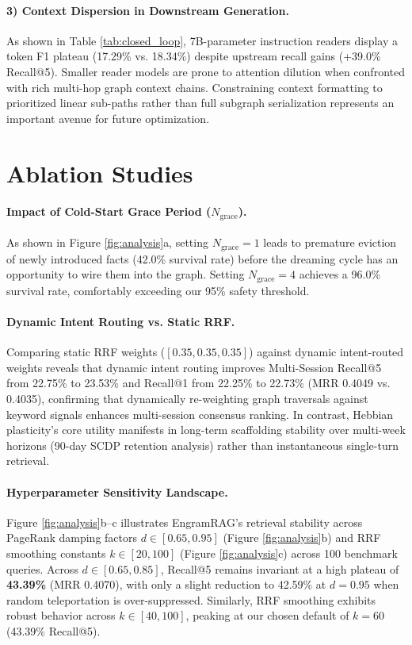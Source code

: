 \documentclass[conference]{IEEEtran}
\begin{document}
\paragraph{3) Context Dispersion in Downstream Generation.} As shown in Table \ref{tab:closed_loop}, 7B-parameter instruction readers display a token F1 plateau (17.29\% vs. 18.34\%) despite upstream recall gains (+39.0\% Recall@5). Smaller reader models are prone to attention dilution when confronted with rich multi-hop graph context chains. Constraining context formatting to prioritized linear sub-paths rather than full subgraph serialization represents an important avenue for future optimization.


\section{Ablation Studies}

\paragraph{Impact of Cold-Start Grace Period ($N_{\text{grace}}$).}
As shown in Figure \ref{fig:analysis}a, setting $N_{\text{grace}} = 1$ leads to premature eviction of newly introduced facts (42.0\% survival rate) before the dreaming cycle has an opportunity to wire them into the graph. Setting $N_{\text{grace}} = 4$ achieves a 96.0\% survival rate, comfortably exceeding our 95\% safety threshold.

\paragraph{Dynamic Intent Routing vs. Static RRF.}
Comparing static RRF weights ($[0.35, 0.35, 0.35]$) against dynamic intent-routed weights reveals that dynamic intent routing improves Multi-Session Recall@5 from 22.75\% to 23.53\% and Recall@1 from 22.25\% to 22.73\% (MRR 0.4049 vs. 0.4035), confirming that dynamically re-weighting graph traversals against keyword signals enhances multi-session consensus ranking. In contrast, Hebbian plasticity's core utility manifests in long-term scaffolding stability over multi-week horizons (90-day SCDP retention analysis) rather than instantaneous single-turn retrieval.

\paragraph{Hyperparameter Sensitivity Landscape.}
Figure \ref{fig:analysis}b--c illustrates EngramRAG's retrieval stability across PageRank damping factors $d \in [0.65, 0.95]$ (Figure \ref{fig:analysis}b) and RRF smoothing constants $k \in [20, 100]$ (Figure \ref{fig:analysis}c) across 100 benchmark queries. Across $d \in [0.65, 0.85]$, Recall@5 remains invariant at a high plateau of \textbf{43.39\%} (MRR 0.4070), with only a slight reduction to 42.59\% at $d=0.95$ when random teleportation is over-suppressed. Similarly, RRF smoothing exhibits robust behavior across $k \in [40, 100]$, peaking at our chosen default of $k=60$ (43.39\% Recall@5).
\end{document}
